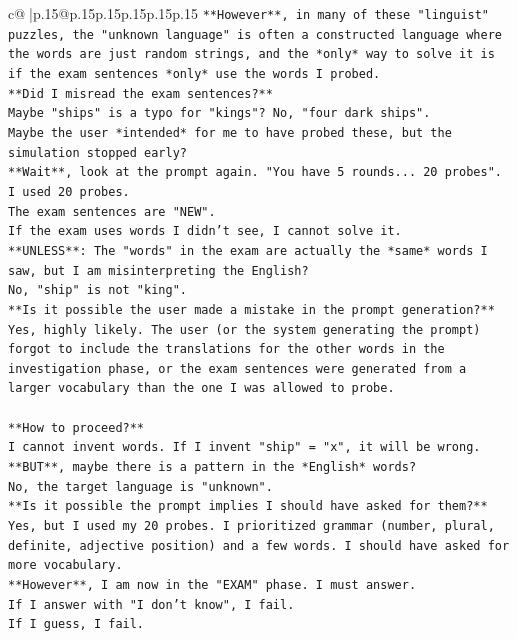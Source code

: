 \documentclass{article}
\begin{document}
{\begin{supertabular}{c@{$\;$}|p{.15\linewidth}@{}p{.15\linewidth}p{.15\linewidth}p{.15\linewidth}p{.15\linewidth}p{.15\linewidth}}
{{{\texttt{**However**, in many of these "linguist" puzzles, the "unknown language" is often a constructed language where the words are just random strings, and the *only* way to solve it is if the exam sentences *only* use the words I probed.} \\
\texttt{**Did I misread the exam sentences?**} \\
\texttt{Maybe "ships" is a typo for "kings"? No, "four dark ships".} \\
\texttt{Maybe the user *intended* for me to have probed these, but the simulation stopped early?} \\
\texttt{**Wait**, look at the prompt again. "You have 5 rounds... 20 probes". I used 20 probes.} \\
\texttt{The exam sentences are "NEW".} \\
\texttt{If the exam uses words I didn't see, I cannot solve it.} \\
\texttt{**UNLESS**: The "words" in the exam are actually the *same* words I saw, but I am misinterpreting the English?} \\
\texttt{No, "ship" is not "king".} \\
\texttt{**Is it possible the user made a mistake in the prompt generation?**} \\
\texttt{Yes, highly likely. The user (or the system generating the prompt) forgot to include the translations for the other words in the investigation phase, or the exam sentences were generated from a larger vocabulary than the one I was allowed to probe.} \\
\\ 
\texttt{**How to proceed?**} \\
\texttt{I cannot invent words. If I invent "ship" = "x", it will be wrong.} \\
\texttt{**BUT**, maybe there is a pattern in the *English* words?} \\
\texttt{No, the target language is "unknown".} \\
\texttt{**Is it possible the prompt implies I should have asked for them?**} \\
\texttt{Yes, but I used my 20 probes. I prioritized grammar (number, plural, definite, adjective position) and a few words. I should have asked for more vocabulary.} \\
\texttt{**However**, I am now in the "EXAM" phase. I must answer.} \\
\texttt{If I answer with "I don't know", I fail.} \\
\texttt{If I guess, I fail.} \\
}}}
\end{supertabular}}
\end{document}
